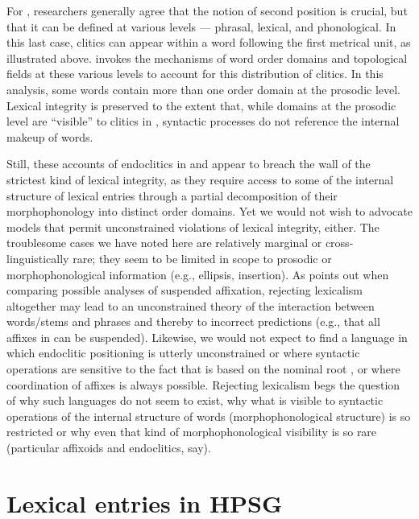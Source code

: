 \documentclass[output=paper
 	        ,biblatex
                ,babelshorthands
                ,newtxmath
                ,draftmode
                ,colorlinks, citecolor=brown
]{langscibook}
\begin{document}
For , researchers generally agree that the notion of second position is crucial, but that it
can be defined at various levels --- phrasal, lexical, and phonological. In this last case, clitics
can appear within a word following the first metrical unit, as illustrated above.
\citet{Dost2007} invokes the mechanisms of word order domains \citep{Reape1994} and topological fields \citep{Kathol2000a} at these various levels to account for this distribution of clitics. In this analysis, some words contain more than one order domain at the prosodic level. Lexical integrity is preserved to the extent that, while domains at the prosodic level are ``visible'' to clitics in , syntactic processes do not reference the internal makeup of words.

Still, these accounts of endoclitics in  and  appear to breach the wall of the strictest kind of lexical integrity, as they require access to some of the internal structure of lexical entries through a partial decomposition of their morphophonology into distinct order domains. Yet we would not wish to advocate models that permit unconstrained violations of lexical integrity, either. The troublesome cases we have noted here are relatively marginal or cross-linguistically rare; they seem to be limited in scope to prosodic or morphophonological information (e.g., ellipsis, insertion). As \citet{Broadwell2008} points out when comparing possible analyses of  suspended affixation, rejecting lexicalism altogether may lead to an unconstrained theory of the interaction between words/stems and phrases and thereby to incorrect predictions (e.g., that all affixes in  can be suspended). Likewise, we would not expect to find a language in which endoclitic positioning is utterly unconstrained or where syntactic operations are sensitive to the fact that  is based on the nominal root , or where coordination of affixes is always possible. Rejecting lexicalism begs the question of why such languages do not seem to exist, why what is visible to syntactic operations of the internal structure of words (morphophonological structure) is so restricted or why even that kind of morphophonological visibility is so rare (particular affixoids and endoclitics, say).


\section{Lexical entries in HPSG}
\end{document}

